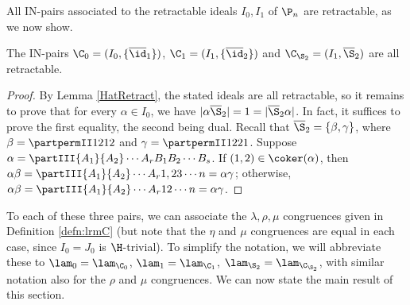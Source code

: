%
%
%



All IN-pairs associated to the retractable ideals $I_0,I_1$ of $\P_n$ are retractable, as we now show.



\begin{lemma}
\label{ThreeTriples}
The IN-pairs $\C_0=(I_0,\{\overline{\id}_1\})$,
$\C_1=(I_1,\{\overline{\id}_2\})$ and
$\C_{\S_2}=(I_1,\overline{\S}_2)$ are all retractable.
\end{lemma}

\begin{proof}
By Lemma \ref{HatRetract}, the stated ideals are all retractable, so it remains to prove that for every $\alpha\in I_0$, we have
$|\alpha \overline{\S}_2|=1=|\overline{\S}_2\alpha|$. 
In fact, it suffices to prove the first equality, the second being dual.
Recall that $\overline{\S}_2=\{\beta,\gamma\}$,
where $\beta=\partpermII1212$ and $\gamma=\partpermII1221$.
Suppose $\alpha=\partIII{A_1}{A_2}\cdots{A_r}{B_1}{B_2}\cdots{B_s}$.
If $(1,2)\in\coker(\alpha)$, then
$\alpha\beta=\partIII{A_1}{A_2}\cdots{A_r}{1,2}{3}\cdots{n}=\alpha\gamma$; otherwise,
$\alpha\beta=\partIII{A_1}{A_2}\cdots{A_r}{1}{2}\cdots{n}=\alpha\gamma$.
\end{proof}

To each of these three pairs, we can associate the $\lambda,\rho,\mu$ congruences given in Definition \ref{defn:lrmC} (but note that the $\eta$ and $\mu$ congruences are equal in each case, since $I_0=J_0$ is $\H$-trivial).  
%
To simplify the notation, we will abbreviate these to $\lam_0=\lam_{\C_0}$, $\lam_1=\lam_{\C_1}$, $\lam_{\S_2}=\lam_{\C_{\S_2}}$, with similar notation also for the $\rho$ and $\mu$ congruences.
%
We can now state the main result of this section.


